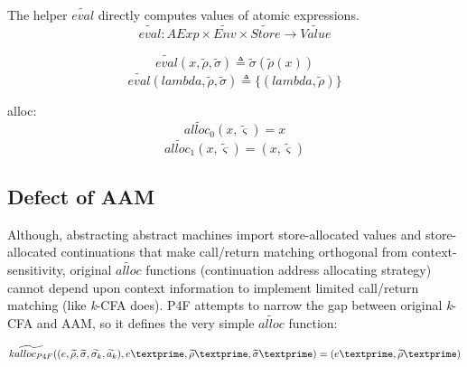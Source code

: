 \documentclass{article}
\begin{document}
The helper $\widetilde{eval}$ directly computes values of atomic expressions.
\[
\widetilde{eval} : AExp \times \widetilde{Env} \times \widetilde{Store} \to \widetilde{Value}
\]

\[
\widetilde{eval}(x, \tilde{\rho}, \tilde{\sigma}) \triangleq \tilde{\sigma}(\tilde{\rho}(x))
\]
\[
\widetilde{eval}(lambda, \tilde{\rho}, \tilde{\sigma}) \triangleq \{(lambda, \tilde{\rho})\}
\]

alloc:
\[
\widetilde{alloc_0} (x, \widetilde{\varsigma}) = x
\]
\[
\widetilde{alloc_1} (x, \widetilde{\varsigma}) = (x, \widetilde{\varsigma})
\]

\subsection{Defect of AAM}
\label{sub:Defect of AAM}
Although, abstracting abstract machines import store-allocated values and store-allocated continuations that make call/return matching orthogonal from context-sensitivity, original $\widetilde{alloc}$ functions (continuation address allocating strategy) cannot depend upon context information to implement limited call/return matching (like \textit{k}-CFA does). P4F attempts to narrow the gap between original \textit{k}-CFA and AAM, so it defines the very simple $\widetilde{alloc}$ function:

\[
\widetilde{kalloc_{P4F}} ((e, \widetilde{\rho}, \widetilde{\sigma}, \widetilde{\sigma_k}, \widetilde{a_k}), e\textprime, \widetilde{\rho}\textprime, \widetilde{\sigma}\textprime) = (e\textprime, \widetilde{\rho}\textprime)
\]
\end{document}
